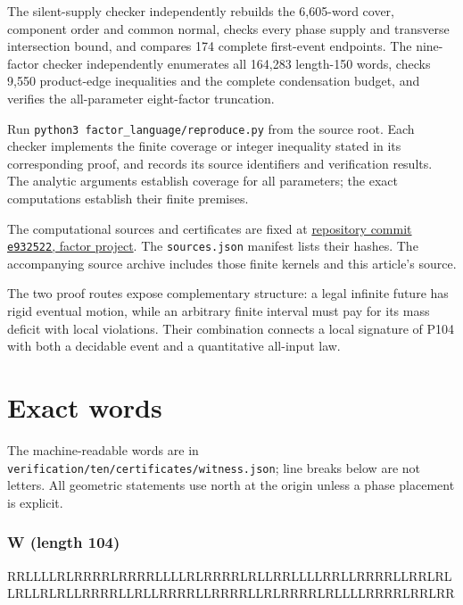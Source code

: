\documentclass[
  11pt,
]{article}
\newenvironment{Shaded}{}{}
\newcommand{\NormalTok}[1]{#1}
\begin{document}
The silent-supply checker independently rebuilds the 6,605-word cover,
component order and common normal, checks every phase supply and transverse
intersection bound, and compares 174 complete first-event endpoints.
The nine-factor checker independently enumerates all 164,283 length-150
words, checks 9,550 product-edge inequalities and the complete condensation
budget, and verifies the all-parameter eight-factor truncation.

Run \texttt{python3\ factor\_language/reproduce.py} from the source
root. Each checker implements the finite coverage or integer inequality
stated in its corresponding proof, and records its source identifiers and
verification results. The analytic arguments establish coverage for all
parameters; the exact computations establish their finite premises.

The computational sources and certificates are fixed at
\href{https://github.com/kehao95/langtons-ant-core/tree/e93252230ea9109908c23a009824d72d30fb91e2/factor_language}{repository commit \texttt{e932522}, factor project}.
The \texttt{sources.json} manifest lists their hashes. The accompanying
source archive includes those finite kernels and this article's source.

The two proof routes expose complementary structure: a legal infinite
future has rigid eventual motion, while an arbitrary finite interval
must pay for its mass deficit with local violations. Their combination
connects a local signature of P104 with both a decidable event and a
quantitative all-input law.

\appendix



\section{Exact words}\label{exact-words}

The machine-readable words are in
\texttt{verification/ten/certificates/witness.json}; line breaks below
are not letters. All geometric statements use north at the origin unless
a phase placement is explicit.

\subsubsection{W (length 104)}\label{w-length-104}

\begin{Shaded}
\begin{Highlighting}[]
\NormalTok{RRLLLLRLRRRRLRRRRLLLLRLRRRRLRLLRRLLLLRRLLRRRRLLRRLRL}
\NormalTok{LRLLRLRLLRRRRLLRLLRRRRLLRRRRLLRLRRRRLRLLLLRRRRLRRLRR}
\end{Highlighting}
\end{Shaded}
\end{document}
